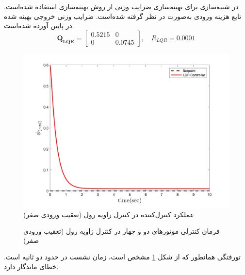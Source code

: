  
 
  در شبیه‌سازی برای بهینه‌سازی ضرایب وزنی  از روش بهینه‌سازی
 \cite{Karimi2010}
استفاده شده‌است.
تابع هزینه ورودی  به‌صورت
در نظر گرفته شده‌است. ضرایب وزنی خروجی بهینه شده در پایین آورده شده‌است.
\begin{equation}
	\boldsymbol{Q_{LQR}} = \begin{bmatrix}
		0.5215 & 0\\
		0 & 0.0745
	\end{bmatrix}, \quad R_{LQR} =  0.0001
\end{equation} 
\begin{figure}[H]
	\includegraphics[width=.48\linewidth]{../Figures/MIL/LQR/Roll/lqr_roll_nn.png}
	\centering
	\caption{عملكرد کنترل‌کننده  در کنترل زاويه رول (تعقیب ورودی صفر)}
	\label{lqr_roll_figure_simulation}
\end{figure}
\begin{figure}[H]
	\centering
	\caption{‫‪فرمان کنترلی موتورهای دو و چهار در کنترل زاویه رول (تعقیب ورودی صفر)}
\end{figure}
‌تورفتگی همانطور که از شکل
\ref{lqr_roll_figure_simulation}
مشخص است، زمان نشست در حدود دو ثانیه است. خطای ماندگار دارد.
